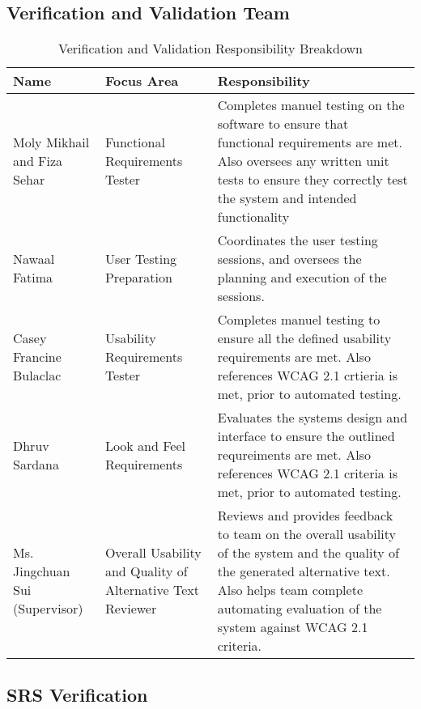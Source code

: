 \documentclass[12pt, titlepage]{article}
\begin{document}
\subsection{Verification and Validation Team}


\begin{table}[H]
    \centering
    \caption{Verification and Validation Responsibility Breakdown}
    \label{tab:data-dictionary-reading4all}
    \begin{tabular}{ |p{3.0cm}|p{3.8cm}|p{7.3cm}| }
      \hline
      \textbf{Name} & \textbf{ Focus Area } & \textbf{Responsibility} \\
      \hline
      Moly Mikhail and Fiza Sehar & Functional Requirements Tester & Completes manuel testing on the software to ensure that functional requirements are met. Also oversees any written unit tests to ensure they correctly test the system and intended functionality \\
      \hline
      Nawaal Fatima & User Testing Preparation & Coordinates the user testing sessions, and oversees the planning and execution of the sessions. \\
      \hline 
      Casey Francine Bulaclac & Usability Requirements Tester & Completes manuel testing to ensure all the defined usability requirements are met. Also references WCAG 2.1 crtieria is met, prior to automated testing. \\
      \hline 
      Dhruv Sardana & Look and Feel Requirements & Evaluates the systems design and interface to ensure the outlined requreiments are met. Also references WCAG 2.1 criteria is met, prior to automated testing. \\
      \hline 
      Ms. Jingchuan Sui (Supervisor) & Overall Usability and Quality of Alternative Text Reviewer & Reviews and provides feedback to team on the overall usability of the system and the quality of the generated alternative text. Also helps team complete automating evaluation of the system against WCAG 2.1 criteria. \\ 
      \hline
    \end{tabular}
  \end{table}
  
  
\subsection{SRS Verification}
\end{document}
